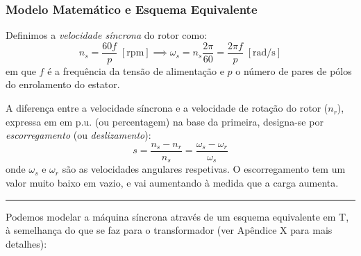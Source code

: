 \subsubsection{Modelo Matemático e Esquema Equivalente}

Definimos a \textit{velocidade síncrona} do rotor como:
$$
    n_s = \frac{60 f}{p}\; [\text{rpm}] \implies \omega_s = n_s \frac{2\pi}{60} = \frac{2\pi f}{p}\; [\text{rad/s}]
$$
em que $f$ é a frequência da tensão de alimentação e $p$ o número de pares de pólos do enrolamento do estator.

A diferença entre a velocidade síncrona e a velocidade de rotação do rotor ($n_r$), expressa em em p.u. (ou percentagem) na base da primeira, designa-se por \textit{escorregamento} (ou \textit{deslizamento}):
$$
    s = \frac{n_s - n_r}{n_s} = \frac{\omega_s - \omega_r}{\omega_s}
$$
onde $\omega_s$ e $\omega_r$ são as velocidades angulares respetivas. O escorregamento tem um valor muito baixo em vazio, e vai aumentando à medida que a carga aumenta.

\vspace{0.5em}
\hrule
\vspace{0.5em}
\noindent Podemos modelar a máquina síncrona através de um esquema equivalente em T, à semelhança do que se faz para o transformador (ver Apêndice X para mais detalhes):

